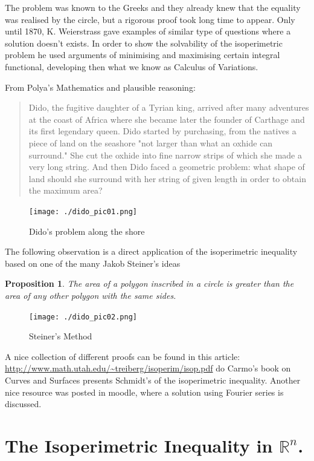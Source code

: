 \documentclass{amsart}
\newtheorem{prop}{Proposition}
\begin{document}
The problem was known to the Greeks and they already knew that the equality was realised by the circle, but a rigorous proof took long time to appear. Only until 1870, K. Weierstrass gave examples of similar type of questions where a solution doesn't exists. In order to show the solvability of the isoperimetric problem he used arguments of minimising and maximising certain integral functional, developing then what we know as Calculus of Variations.

From Polya's Mathematics and plausible reasoning:

\begin{quote}
Dido, the fugitive daughter of a Tyrian king, arrived after many
adventures at the coast of Africa where she became later the founder of
Carthage and its first legendary queen. Dido started by purchasing, from
the natives a piece of land on the seashore "not larger than what an oxhide
can surround." She cut the oxhide into fine narrow strips of which she
made a very long string. And then Dido faced a geometric problem:
what shape of land should she surround with her string of given length in
order to obtain the maximum area?
\end{quote}

\begin{figure}[htbp]
\centering
\texttt{[image: ./dido\_pic01.png]}
\caption{\label{fig:orgf8ced5b}Dido's problem along the shore}
\end{figure}


The following observation is a direct application of the isoperimetric inequality based on one of the many Jakob Steiner's ideas
\begin{prop}
The area of a polygon inscribed in a circle is greater than the area of any other polygon
with the same sides.
\end{prop}

\begin{figure}[htbp]
\centering
\texttt{[image: ./dido\_pic02.png]}
\caption{\label{fig:org23e01bb}Steiner's Method}
\end{figure}



A nice collection of different proofs can be found in this article: \url{http://www.math.utah.edu/\~treiberg/isoperim/isop.pdf}
do Carmo's book on Curves and Surfaces presents Schmidt's of the isoperimetric inequality.
Another nice resource was posted in moodle, where a solution using Fourier series is discussed.

\section{The Isoperimetric Inequality in \(\mathbb{R}^n\).}
\label{sec:org10cc5e0}
\end{document}
